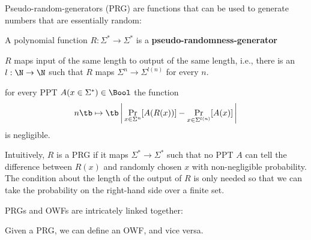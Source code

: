 Pseudo-random-generators (PRG) are functions that can be used to generate numbers that are essentially random:
\begin{definition}
 A polynomial function $R:\Sigma^*\to\Sigma^*$ is a \textbf{pseudo-randomness-generator}
 \begin{compactitem}
   \item $R$ maps input of the same length to output of the same length, i.e., there is an $l:\N\to\N$ such that $R$ maps $\Sigma^n\to\Sigma^{l(n)}$ for every $n$.
   \item for every PPT $A(x\in\Sigma^*)\in\Bool$ the function
  \[n \tb\mapsto \tb \left|\,\Prob{x\in\Sigma^n}{A(R(x))}-\Prob{x\in\Sigma^{l(n)}}{A(x)}\,\right|\]
  is negligible.
 \end{compactitem}
\end{definition}

Intuitively, $R$ is a PRG if it maps $\Sigma^*\to\Sigma^*$ such that no PPT $A$ can tell the difference between $R(x)$ and randomly chosen $x$ with non-negligible probability.
The condition about the length of the output of $R$ is only needed so that we can take the probability on the right-hand side over a finite set.

PRGs and OWFs are intricately linked together:
\begin{theorem}
Given a PRG, we can define an OWF, and vice versa.
\end{theorem}

%
